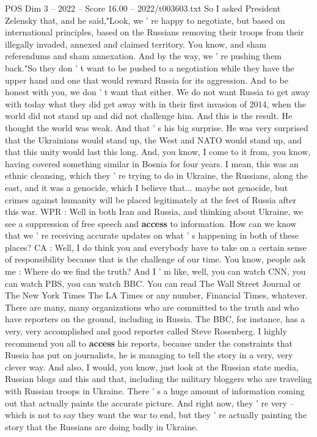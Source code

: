 \begin{textsample}{POS Dim 3 – 2022 – Score 16.00 – 2022/t003603.txt}
So I asked President Zelensky that, and he said,"Look, we ' re happy to negotiate, but based on international principles, based on the Russians removing their troops from their illegally invaded, annexed and claimed territory.
You know, and sham referendums and sham annexation.
And by the way, we ' re pushing them back."So they don ' t want to be pushed to a negotiation while they have the upper hand and one that would reward Russia for its aggression.
And to be honest with you, we don ' t want that either.
We do not want Russia to get away with today what they did get away with in their first invasion of 2014, when the world did not stand up and did not challenge him.
And this is the result.
He thought the world was weak.
And that ' s his big surprise.
He was very surprised that the Ukrainians would stand up, the West and NATO would stand up, and that this unity would last this long.
And, you know, I come to it from, you know, having covered something similar in Bosnia for four years.
I mean, this was an ethnic cleansing, which they ' re trying to do in Ukraine, the Russians, along the east, and it was a genocide, which I believe that... maybe not genocide, but crimes against humanity will be placed legitimately at the feet of Russia after this war.
WPR : Well in both Iran and Russia, and thinking about Ukraine, we see a suppression of free speech and \textbf{access} to information.
How can we know that we ' re receiving accurate updates on what ' s happening in both of these places?
CA : Well, I do think you and everybody have to take on a certain sense of responsibility because that is the challenge of our time.
You know, people ask me : Where do we find the truth?
And I ' m like, well, you can watch CNN, you can watch PBS, you can watch BBC.
You can read The Wall Street Journal or The New York Times The LA Times or any number, Financial Times, whatever.
There are many, many organizations who are committed to the truth and who have reporters on the ground, including in Russia.
The BBC, for instance, has a very, very accomplished and good reporter called Steve Rosenberg.
I highly recommend you all to \textbf{access} his reports, because under the constraints that Russia has put on journalists, he is managing to tell the story in a very, very clever way.
And also, I would, you know, just look at the Russian state media, Russian blogs and this and that, including the military bloggers who are traveling with Russian troops in Ukraine.
There ' s a huge amount of information coming out that actually paints the accurate picture.
And right now, they ' re very -- which is not to say they want the war to end, but they ' re actually painting the story that the Russians are doing badly in Ukraine.

\end{textsample}
